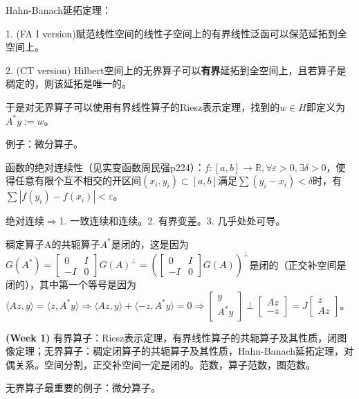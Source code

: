 Hahn-Banach延拓定理：

1. (FA I version)赋范线性空间的线性子空间上的有界线性泛函可以保范延拓到全空间上。

2. (CT version) Hilbert空间上的无界算子可以\textbf{有界}延拓到全空间上，且若算子是稠定的，则该延拓是唯一的。

于是对无界算子可以使用有界线性算子的Riesz表示定理，找到的$w \in H$即定义为$A^{\ast}y := w$。

例子：微分算子。

函数的绝对连续性（见实变函数周民强p224）：$f:[a, b] \to \mathbb{R}, \forall \varepsilon > 0, \exists \delta > 0$，使得任意有限个互不相交的开区间$(x_i, y_i) \subset [a, b]$满足$\sum (y_i - x_i) < \delta$时，有$\sum |f(y_i) - f(x_i)| < \varepsilon$。

绝对连续$\Rightarrow$1. 一致连续和连续。2. 有界变差。3. 几乎处处可导。

稠定算子A的共轭算子$A^{\ast}$是闭的，这是因为$G\left(A^{*}\right)=\left[\begin{array}{cc}
  0 & I \\
  -I & 0
\end{array}\right] G(A)^{\perp}=\left(\left[\begin{array}{cc}
  0 & I \\
  -I & 0
\end{array}\right] G(A)\right)^{\perp}$是闭的（正交补空间是闭的），其中第一个等号是因为$\langle Az, y \rangle = \langle z, A^{\ast}y \rangle \Rightarrow \langle Az, y \rangle + \langle -z, A^{\ast}y \rangle = 0 \Rightarrow \left[ \begin{matrix}
  y\\
  A^{\ast}y
\end{matrix} \right] \perp \left[ \begin{matrix}
  Az\\
  -z
\end{matrix} \right] = J\left[ \begin{matrix}
  z\\
  Az
\end{matrix} \right]$。

\begin{conc}
  \textbf{(Week 1)} 有界算子：Riesz表示定理，有界线性算子的共轭算子及其性质，闭图像定理；无界算子：稠定闭算子的共轭算子及其性质，Hahn-Banach延拓定理，对偶关系。空间分割，正交补空间一定是闭的。范数，算子范数，图范数。
\end{conc}

无界算子最重要的例子：微分算子。

